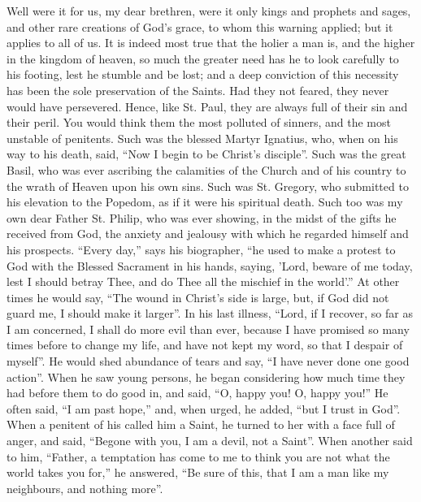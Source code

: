 Well were it for us, my dear brethren, were it only kings and
prophets and sages, and other rare creations of God's grace, to whom
this warning applied; but it applies to all of us. It is indeed most
true that the holier a man is, and the higher in the kingdom of
heaven, so much the greater need has he to look carefully to his
footing, lest he stumble and be lost; and a deep conviction of this
necessity has been the sole preservation of the Saints. Had they not
feared, they never would have persevered. Hence, like St. Paul, they
are always full of their sin and their peril. You would think them the
most polluted of sinners, and the most unstable of penitents. Such was
the blessed Martyr Ignatius, who, when on his way to his death, said,
``Now I begin to be Christ's disciple''. Such was the great
Basil, who was ever ascribing the calamities of the Church and of his
country to the wrath of Heaven upon his own sins. Such was St.
Gregory, who submitted to his elevation to the Popedom, as if it were
his spiritual death. Such too was my own dear Father St. Philip, who
was ever showing, in the midst of the gifts he received from God, the
anxiety and jealousy with which he regarded himself and his prospects.
``Every day,'' says his biographer, ``he used to make a
protest to God with the Blessed Sacrament in his hands, saying, 'Lord,
beware of me today, lest I should betray Thee, and do Thee all the
mischief in the world'.'' At other times he would say, ``The
wound in Christ's side is large, but, if God did not guard me, I
should make it larger''. In his last illness, ``Lord, if I
recover, so far as I am concerned, I shall do more evil than ever,
because I have promised so many times before to change my life, and
have not kept my word, so that I despair of myself''. He would
shed abundance of tears and say, ``I have never done one good
action''. When he saw young persons, he began considering how much
time they had before them to do good in, and said, ``O, happy you!
O, happy you!'' He often said, ``I am past hope,'' and,
when urged, he added, ``but I trust in God''. When a penitent
of his called him a Saint, he turned to her with a face full of anger,
and said, ``Begone with you, I am a devil, not a Saint''. When
another said to him, ``Father, a temptation has come to me to
think you are not what the world takes you for,'' he answered,
``Be sure of this, that I am a man like my neighbours, and nothing
more''.

